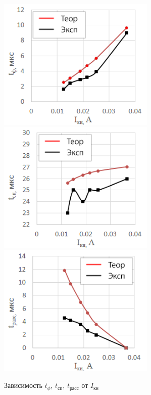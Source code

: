 \begin{figure}[H]
	\begin{center}
		\includegraphics[width=7.5cm]{img/tf_ikn}
		\includegraphics[width=7.5cm]{img/tsp_ikn}
		\includegraphics[width=7.5cm]{img/trass_ikn}
		\caption{Зависимость $t_\phi$, $t_\text{сп}$, $t_\text{расс}$ от $I_{\text{кн}}$}
		\label{fig:ikn}
	\end{center}
\end{figure}

